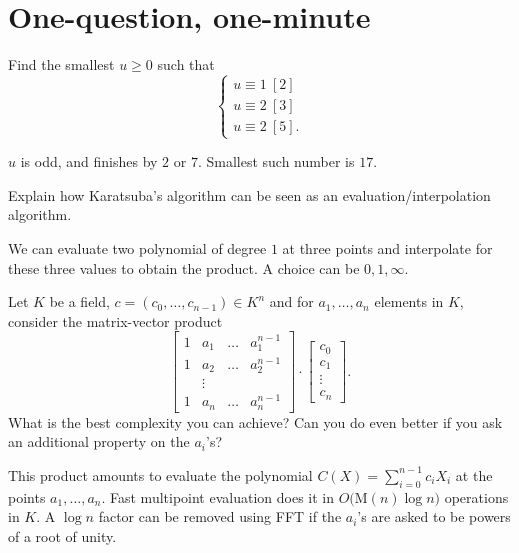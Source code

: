 \documentclass[11pt]{exam}
\theoremstyle{definition}
\begin{document}
{\begin{questions}
  \end{questions}
  \section{One-question, one-minute}

  \begin{questions}

    \question Find the smallest $u\geq 0$ such that
    $$\begin{cases} u\equiv 1~[2]\\ u\equiv 2~[3]\\ u\equiv 2~[5]. \end{cases}$$

    \begin{solution}
      $u$ is odd, and finishes by $2$ or $7$. Smallest such number is $17$. 
    \end{solution}

    \question Explain how Karatsuba's algorithm can be seen as an evaluation/interpolation algorithm.

    \begin{solution}
      We can evaluate two polynomial of degree $1$ at three points and interpolate for these three values to obtain the product. A choice can be $0,1,\infty$.
    \end{solution}

    \question Let $K$ be a field, $c=(c_0, \dotsc, c_{n-1}) \in K^n$ and for $a_1, \dotsc, a_n$ elements in $K$, consider the matrix-vector product
    $$\begin{bmatrix} 1 & a_1 & \dots & a_1^{n-1} \\
      1 & a_2 & \dots & a_2^{n-1}\\
      & \vdots & & \\
      1 & a_n & \dots & a_n^{n-1}\end{bmatrix}\cdot \begin{bmatrix} c_0 \\ c_1 \\ \vdots \\ c_n \end{bmatrix}.$$
    What is the best complexity you can achieve? Can you do even better if you ask an additional property on the $a_i$'s?

    \begin{solution}
      This product amounts to evaluate the polynomial $C(X) = \sum_{i=0}^{n-1}c_iX_i$ at the points $a_1, \dotsc, a_n$. Fast multipoint evaluation does it in $O(${\sc M}$(n)\log n)$ operations in $K$. A $\log n$ factor can be removed using FFT if the $a_i$'s are asked to be powers of a root of unity.
      \end{solution}
      

\end{questions}}
\end{document}
